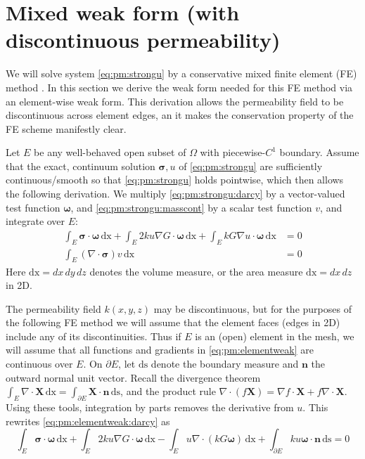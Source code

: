\documentclass[11pt]{amsart}
\newcommand{\bn}{\mathbf{n}}
\newcommand{\bX}{\mathbf{X}}
\newcommand{\bsigma}{\bm{\sigma}}
\newcommand{\bomega}{\bm{\omega}}
\newcommand{\dx}{\mathrm{dx}}
\newcommand{\ds}{\mathrm{ds}}
\newcommand{\Div}{\nabla\cdot}
\newcommand{\grad}{\nabla}
\begin{document}
\section{Mixed weak form (with discontinuous permeability)}

We will solve system \eqref{eq:pm:strongu} by a conservative mixed finite element (FE) method \citep{Boffi2013}.  In this section we derive the weak form needed for this FE method via an element-wise weak form.  This derivation allows the permeability field to be discontinuous across element edges, an it makes the conservation property of the FE scheme manifestly clear.

Let $E$ be any well-behaved open subset of $\Omega$ with piecewise-$C^1$ boundary.  Assume that the exact, continuum solution $\bsigma,u$ of \eqref{eq:pm:strongu} are sufficiently continuous/smooth so that \eqref{eq:pm:strongu} holds pointwise, which then allows the following derivation.  We multiply \eqref{eq:pm:strongu:darcy} by a vector-valued test function $\bomega$, and \eqref{eq:pm:strongu:masscont} by a scalar test function $v$, and integrate over $E$:
\begin{subequations}
\label{eq:pm:elementweak}
\begin{align}
\int_E \bsigma\cdot \bomega\,\dx + \int_E 2 k u \grad G \cdot \bomega\,\dx + \int_E k G \grad u \cdot \bomega\,\dx &= 0 \label{eq:pm:elementweak:darcy} \\
\int_E (\Div \bsigma) v\,\dx &= 0 \label{eq:pm:elementweak:masscont}
\end{align}
\end{subequations}
Here $\dx = dx\,dy\,dz$ denotes the volume measure, or the area measure $\dx = dx\,dz$ in 2D.

The permeability field $k(x,y,z)$ may be discontinuous, but for the purposes of the following FE method we will assume that the element faces (edges in 2D) include any of its discontinuities.  Thus if $E$ is an (open) element in the mesh, we will assume that all functions and gradients in \eqref{eq:pm:elementweak} are continuous over $E$.  On $\partial E$, let $\ds$ denote the boundary measure and $\bn$ the outward normal unit vector.  Recall the divergence theorem $\int_E \Div \bX\,\dx = \int_{\partial E} \bX\cdot \bn\,\ds$, and the product rule $\Div(f\bX) = \grad f \cdot \bX + f \Div \bX$.  Using these tools, integration by parts removes the derivative from $u$.  This rewrites \eqref{eq:pm:elementweak:darcy} as
\begin{equation}
\int_E \bsigma\cdot \bomega\,\dx + \int_E 2 k u \grad G \cdot \bomega\,\dx - \int_E u \Div\left(k G \bomega\right)\,\dx + \int_{\partial E} k u \bomega\cdot\bn\,\ds = 0 \label{eq:elementweak:darcy:early}
\end{equation}
\end{document}
